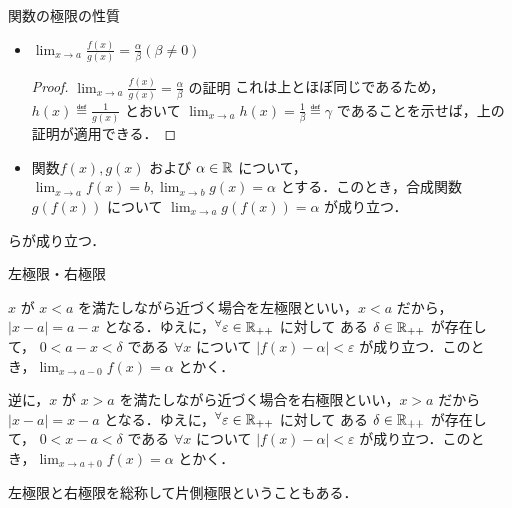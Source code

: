 \documentclass[a4paper]{ltjsarticle}
\begin{document}
\begin{theorem}{関数の極限の性質}{}
\begin{itemize}
\begin{proof}{$\displaystyle \lim_{x \to a} f(x)g(x) = \alpha\beta$ の証明}{}
        このとき，正の実数 $M = \max\{|\alpha - \varepsilon_1|, |\alpha + \varepsilon_1|\}$ ととると，$f(x) < M$ である．
        $\delta = \min\{\delta_1, \delta_2\}$ とすると，三角不等式より $|f(x)g(x) - \alpha\beta| = |f(x)(g(x) - \beta) + \beta(f(x) - \alpha)| \leq |f(x)(g(x) - \beta)| + |\beta(f(x) - \alpha)| 
        = |\alpha|\varepsilon_2 + |\beta|\varepsilon_1 < M\varepsilon_2 + |\beta|\varepsilon_1$ である．$\varepsilon \eqdef M\varepsilon_2 + |\beta|\varepsilon_1$ 
        改めておく（$\varepsilon_1 と \varepsilon_2$ が正の実数だから $\varepsilon$ も正）．ゆえに$\displaystyle \lim_{x \to a} f(x)g(x) = \alpha\beta$ が示された．
      \end{proof}
      \item $\displaystyle \lim_{x \to a} \frac{f(x)}{g(x)} = \frac{\alpha}{\beta} (\beta \neq 0)$
      \begin{proof}{$\displaystyle \lim_{x \to a} \frac{f(x)}{g(x)} = \frac{\alpha}{\beta}$ の証明}{}
        これは上とほぼ同じであるため，$h(x) \eqdef \frac{1}{g(x)}$ とおいて $\lim_{x \to a} h(x) = \frac{1}{\beta} \eqdef \gamma$ であることを示せば，上の証明が適用できる．
      \end{proof}
      \item 関数$f(x), g(x)$ および $\alpha \in \mathbb{R}$ について，$\lim_{x \to a} f(x) = b, \lim_{x \to b} g(x) = \alpha$ とする．このとき，合成関数 $g(f(x))$ について $\lim_{x \to a}g(f(x)) = \alpha$ が成り立つ．
    \end{itemize}

    らが成り立つ．
  \end{theorem}
  
  \begin{tcb}{左極限・右極限}{}
  
  $x$ が $x < a$ を満たしながら近づく場合を左極限といい，$x < a$ だから，$|x - a| = a - x$ となる．ゆえに，$\forall \varepsilon \in \R_{++}$ に対して ある $\delta \in \mathbb{R}_{++}$ が存在して， 
  $0 < a - x < \delta$ である $\forall x$ について $|f(x) - \alpha| < \varepsilon$ が成り立つ．このとき，$\displaystyle \lim_{x \to a-0} f(x) = \alpha$ とかく．

  逆に，$x$ が $x > a$ を満たしながら近づく場合を右極限といい，$x > a$ だから $|x - a| = x - a$ となる．ゆえに，$\forall \varepsilon \in \R_{++}$ に対して ある $\delta \in \mathbb{R}_{++}$ が存在して， 
  $0 < x - a < \delta$ である $\forall x$ について $|f(x) - \alpha| < \varepsilon$ が成り立つ．このとき，$\displaystyle \lim_{x \to a+0} f(x) = \alpha$ とかく．

  左極限と右極限を総称して片側極限ということもある．
  \end{tcb}
\end{document}
